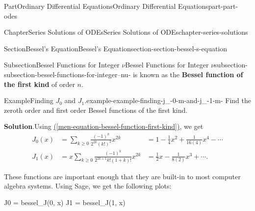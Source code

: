 \documentclass[twoside,10pt,]{book}
\newcommand{\blocktitlefont}{\relax}
\newcommand{\xreffont}{\relax}
\newcommand{\terminology}[1]{\textbf{#1}}
\numberwithin{equation}{part}
\begin{document}
\begin{partptx}{Part}{Ordinary Differential Equations}{}{Ordinary Differential Equations}{}{}{part-part-odes}
\begin{chapterptx}{Chapter}{Series Solutions of ODEs}{}{Series Solutions of ODEs}{}{}{chapter-series-solutions}
\begin{sectionptx}{Section}{Bessel's Equation}{}{Bessel's Equation}{}{}{section-section-bessel-s-equation}
\begin{subsectionptx}{Subsection}{Bessel Functions for Integer \(\nu\)}{}{Bessel Functions for Integer \(\nu\)}{}{}{subsection-subsection-bessel-functions-for-integer--nu-}
is known as the \terminology{Bessel function of the first kind} of order \(n\).%
\begin{example}{Example}{Finding \(J_{0}\) and \(J_{1}\).}{example-example-finding-j_-0-m-and-j_-1-m-}%
Find the zeroth order and first order Bessel functions of the first kind.%
\par\smallskip%
\noindent\textbf{\blocktitlefont Solution}.\hypertarget{solution-example-finding-j_-0-m-and-j_-1-m--c}{}\quad{}Using \hyperref[men-equation-bessel-function-first-kind]{({\xreffont\ref{men-equation-bessel-function-first-kind}})}, we get%
\begin{align*}
J_{0}(x) & = \sum_{k\geq0}\frac{(-1)^{k}}{2^{2k}(k!)^{2}}x^{2k} &= 1 - \frac{1}{4}x^{2} + \frac{1}{16(4)}x^{4} - \cdots\\
J_{1}(x) & = x\sum_{k\geq0}\frac{(-1)^{k}}{2^{2k + 1}k!(1 + k)!}x^{2k} &= \frac{1}{2}x - \frac{1}{8(2)}x^{3} + \cdots\text{.}
\end{align*}
%
\end{example}
These functions are important enough that they are built-in to most computer algebra systems. Using Sage, we get the following plots:%
\begin{sageinput}
J0 = bessel_J(0, x)
J1 = bessel_J(1, x)


\end{sageinput}
\end{subsectionptx}
\end{sectionptx}
\end{chapterptx}
\end{partptx}
\end{document}
